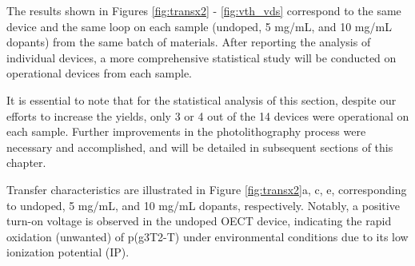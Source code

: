 


The results shown in Figures \ref{fig:transx2} - \ref{fig:vth_vds} correspond to the same device and the same loop on each sample (undoped, 5 mg/mL, and 10 mg/mL dopants) from the same batch of materials. After reporting the analysis of individual devices, a more comprehensive statistical study will be conducted on operational devices from each sample. 

It is essential to note that for the statistical analysis of this section, despite our efforts to increase the yields, only 3 or 4 out of the 14 devices were operational on each sample. Further improvements in the photolithography process were necessary and accomplished, and will be detailed in subsequent sections of this chapter. 

Transfer characteristics are illustrated in Figure \ref{fig:transx2}a, c, e, corresponding to undoped, 5 mg/mL, and 10 mg/mL dopants, respectively. Notably, a positive turn-on voltage is observed in the undoped OECT device, indicating the rapid oxidation (unwanted) of p(g3T2-T) under environmental conditions due to its low ionization potential (IP). 

